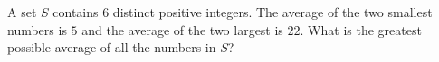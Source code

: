A set $S$ contains $6$ distinct positive integers. The average of the two smallest numbers is $5$ and the average of the two largest is $22$. What is the greatest possible average of all the numbers in $S$?
